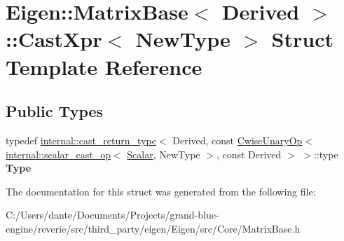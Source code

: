\hypertarget{struct_eigen_1_1_matrix_base_1_1_cast_xpr}{}\section{Eigen\+::Matrix\+Base$<$ Derived $>$\+::Cast\+Xpr$<$ New\+Type $>$ Struct Template Reference}
\label{struct_eigen_1_1_matrix_base_1_1_cast_xpr}
\subsection*{Public Types}
\begin{DoxyCompactItemize}
\item 
\mbox{\label{struct_eigen_1_1_matrix_base_1_1_cast_xpr_ac97d00889be890a13ca4059798508bd8}} 
typedef \mbox{\hyperlink{struct_eigen_1_1internal_1_1cast__return__type}{internal\+::cast\+\_\+return\+\_\+type}}$<$ Derived, const \mbox{\hyperlink{class_eigen_1_1_cwise_unary_op}{Cwise\+Unary\+Op}}$<$ \mbox{\hyperlink{struct_eigen_1_1internal_1_1scalar__cast__op}{internal\+::scalar\+\_\+cast\+\_\+op}}$<$ \mbox{\hyperlink{class_eigen_1_1_dense_base_a5feed465b3a8e60c47e73ecce83e39a2}{Scalar}}, New\+Type $>$, const Derived $>$ $>$\+::type {\bfseries Type}
\end{DoxyCompactItemize}


The documentation for this struct was generated from the following file\+:\begin{DoxyCompactItemize}
\item 
C\+:/\+Users/dante/\+Documents/\+Projects/grand-\/blue-\/engine/reverie/src/third\+\_\+party/eigen/\+Eigen/src/\+Core/Matrix\+Base.\+h\end{DoxyCompactItemize}

